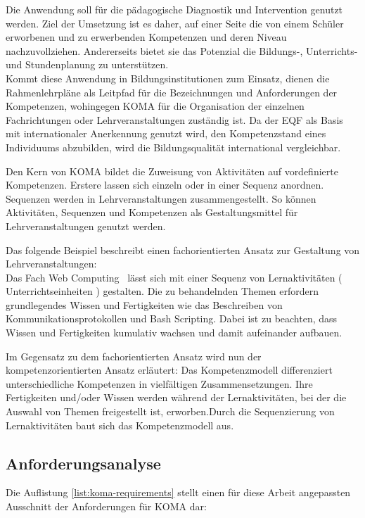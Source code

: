 \documentclass[
12pt,
english,
ngerman,
headsepline,
twoside,
openright,
numbers=noenddot,version=first
]{scrreprt}
\begin{document}
Die Anwendung soll für die pädagogische Diagnostik und Intervention genutzt werden.
Ziel der Umsetzung ist es daher, auf einer Seite die von einem Schüler erworbenen und zu erwerbenden Kompetenzen und deren Niveau nachzuvollziehen. Andererseits bietet sie das Potenzial die Bildungs-, Unterrichts- und Stundenplanung zu unterstützen.\\

Kommt diese Anwendung in Bildungsinstitutionen zum Einsatz, dienen die Rahmenlehrpläne als Leitpfad für die Bezeichnungen und Anforderungen der Kompetenzen, wohingegen \acrshort{KOMA} für die Organisation der einzelnen Fachrichtungen oder Lehrveranstaltungen zuständig ist. Da der \acrshort{EQF} als Basis mit internationaler Anerkennung genutzt wird, den Kompetenzstand eines Individuums abzubilden, wird die Bildungsqualität international vergleichbar.

Den Kern von \acrshort{KOMA} bildet die Zuweisung von Aktivitäten auf vordefinierte Kompetenzen. Erstere lassen sich einzeln oder in einer Sequenz anordnen. Sequenzen werden in Lehrveranstaltungen zusammengestellt. So können Aktivitäten, Sequenzen und Kompetenzen als Gestaltungsmittel für Lehrveranstaltungen genutzt werden. 


Das folgende Beispiel beschreibt einen fachorientierten Ansatz zur Gestaltung von Lehrveranstaltungen:\\
Das Fach \glqq Web Computing \grqq\ lässt sich mit einer Sequenz von Lernaktivitäten ( Unterrichtseinheiten ) gestalten. Die zu behandelnden Themen erfordern grundlegendes Wissen und Fertigkeiten wie das Beschreiben von Kommunikationsprotokollen und Bash Scripting. Dabei ist zu beachten, dass Wissen und Fertigkeiten kumulativ wachsen und damit aufeinander aufbauen.

Im Gegensatz zu dem fachorientierten Ansatz wird nun der kompetenzorientierten Ansatz erläutert:
Das Kompetenzmodell differenziert unterschiedliche Kompetenzen in vielfältigen Zusammensetzungen. Ihre Fertigkeiten und/oder Wissen werden während der  Lernaktivitäten, bei der die Auswahl von Themen freigestellt ist, erworben.Durch die Sequenzierung von Lernaktivitäten baut sich das Kompetenzmodell aus.


\subsection{Anforderungsanalyse}
Die Auflistung \autoref{list:koma-requirements} stellt einen für diese Arbeit angepassten Ausschnitt der Anforderungen für \acrshort{KOMA} dar:
\end{document}
